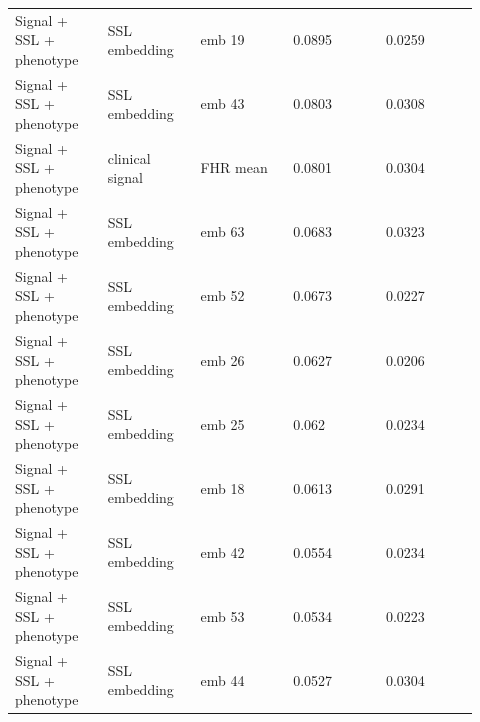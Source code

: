 \documentclass[11pt]{article}
\begin{document}
\begin{landscape}
\begin{longtable}{L{0.184\linewidth} L{0.184\linewidth} L{0.184\linewidth} L{0.184\linewidth} L{0.184\linewidth}}
Signal + SSL + phenotype & SSL embedding & emb 19 & 0.\allowbreak{}0895 & 0.\allowbreak{}0259 \\
Signal + SSL + phenotype & SSL embedding & emb 43 & 0.\allowbreak{}0803 & 0.\allowbreak{}0308 \\
Signal + SSL + phenotype & clinical signal & FHR mean & 0.\allowbreak{}0801 & 0.\allowbreak{}0304 \\
Signal + SSL + phenotype & SSL embedding & emb 63 & 0.\allowbreak{}0683 & 0.\allowbreak{}0323 \\
Signal + SSL + phenotype & SSL embedding & emb 52 & 0.\allowbreak{}0673 & 0.\allowbreak{}0227 \\
Signal + SSL + phenotype & SSL embedding & emb 26 & 0.\allowbreak{}0627 & 0.\allowbreak{}0206 \\
Signal + SSL + phenotype & SSL embedding & emb 25 & 0.\allowbreak{}062 & 0.\allowbreak{}0234 \\
Signal + SSL + phenotype & SSL embedding & emb 18 & 0.\allowbreak{}0613 & 0.\allowbreak{}0291 \\
Signal + SSL + phenotype & SSL embedding & emb 42 & 0.\allowbreak{}0554 & 0.\allowbreak{}0234 \\
Signal + SSL + phenotype & SSL embedding & emb 53 & 0.\allowbreak{}0534 & 0.\allowbreak{}0223 \\
Signal + SSL + phenotype & SSL embedding & emb 44 & 0.\allowbreak{}0527 & 0.\allowbreak{}0304 \\
\end{longtable}
\normalsize
\end{landscape}
\end{document}
